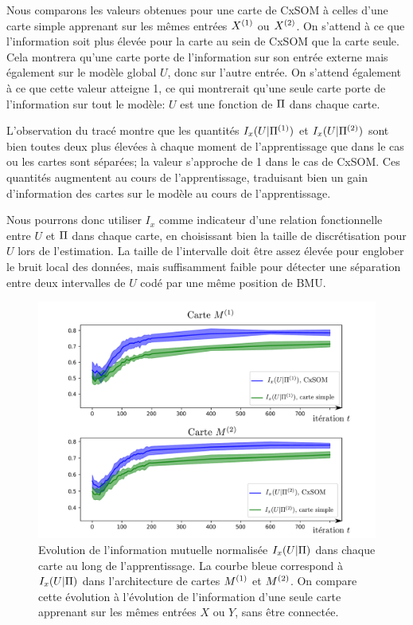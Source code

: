 \documentclass[../main]{subfiles}
\begin{document}
Nous comparons les valeurs obtenues pour une carte de CxSOM à celles d'une carte simple apprenant sur les mêmes entrées $X^{({1})}$ ou $X^{({2})}$.
On s'attend à ce que l'information soit plus élevée pour la carte au sein de CxSOM que la carte seule. Cela montrera qu'une carte porte de l'information sur son entrée externe mais également sur le modèle global $U$, donc sur l'autre entrée.
On s'attend également à ce que cette valeur atteigne 1, ce qui montrerait qu'une seule carte porte de l'information sur tout le modèle: $U$ est une fonction de $\Pi$ dans chaque carte.

L'observation du tracé montre que les quantités $I_x(U|\Pi^{({1})})$ et $I_x(U|\Pi^{({2})})$ sont bien toutes deux plus élevées à chaque moment de l'apprentissage que dans le cas ou les cartes sont séparées; la valeur s'approche de 1 dans le cas de CxSOM.
Ces quantités augmentent au cours de l'apprentissage, traduisant bien un gain d'information des cartes sur le modèle au cours de l'apprentissage.

Nous pourrons donc utiliser $I_x$ comme indicateur d'une relation fonctionnelle entre $U$ et $\Pi$ dans chaque carte, en choisissant bien la taille de discrétisation pour $U$ lors de l'estimation. La taille de l'intervalle doit être assez élevée pour englober le bruit local des données, mais suffisamment faible pour détecter une séparation entre deux intervalles de $U$ codé par une même position de BMU.

\begin{figure}
\includegraphics[width=\textwidth]{evolution_MI_binning}
\caption{Evolution de l'information mutuelle normalisée $I_x(U|\Pi)$ dans chaque carte au long de l'apprentissage. La courbe bleue correspond à $I_x(U|\Pi)$ dans l'architecture de cartes $M^{({1})}$ et $M^{({2})}$. On compare cette évolution à l'évolution de l'information d'une seule carte apprenant sur les mêmes entrées $X$ ou $Y$, sans être connectée.}
    \label{fig:MI_evol}
\end{figure}
\end{document}
